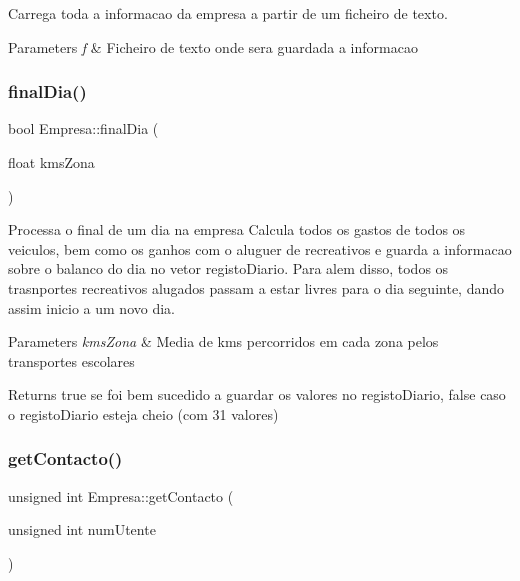 Carrega toda a informacao da empresa a partir de um ficheiro de texto. 


\begin{DoxyParams}{Parameters}
{\em f} & Ficheiro de texto onde sera guardada a informacao \\
\hline
\end{DoxyParams}
\mbox{\label{class_empresa_af41234653cd92b527030ebd3f67ee7a5}} 
\subsubsection{\texorpdfstring{final\+Dia()}{finalDia()}}
{\footnotesize\ttfamily bool Empresa\+::final\+Dia (\begin{DoxyParamCaption}\item[{float}]{kms\+Zona }\end{DoxyParamCaption})}



Processa o final de um dia na empresa Calcula todos os gastos de todos os veiculos, bem como os ganhos com o aluguer de recreativos e guarda a informacao sobre o balanco do dia no vetor registo\+Diario. Para alem disso, todos os trasnportes recreativos alugados passam a estar livres para o dia seguinte, dando assim inicio a um novo dia. 


\begin{DoxyParams}{Parameters}
{\em kms\+Zona} & Media de kms percorridos em cada zona pelos transportes escolares\\
\hline
\end{DoxyParams}
\begin{DoxyReturn}{Returns}
true se foi bem sucedido a guardar os valores no registo\+Diario, false caso o registo\+Diario esteja cheio (com 31 valores) 
\end{DoxyReturn}
\mbox{\label{class_empresa_ae2d2c99704126f1364b666f1973fb8cf}} 
\subsubsection{\texorpdfstring{get\+Contacto()}{getContacto()}\hspace{0.1cm}{\footnotesize\ttfamily [1/2]}}
{\footnotesize\ttfamily unsigned int Empresa\+::get\+Contacto (\begin{DoxyParamCaption}\item[{unsigned int}]{num\+Utente }\end{DoxyParamCaption})}



